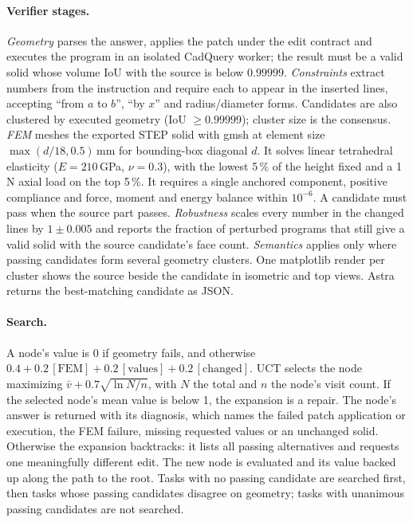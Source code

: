 \paragraph{Verifier stages.}
\emph{Geometry} parses the answer, applies the patch under the edit contract and executes the program in an isolated CadQuery worker; the result must be a valid solid whose volume IoU with the source is below $0.99999$. \emph{Constraints} extract numbers from the instruction and require each to appear in the inserted lines, accepting ``from $a$ to $b$'', ``by $x$'' and radius/diameter forms. Candidates are also clustered by executed geometry (IoU $\geq0.99999$); cluster size is the consensus. \emph{FEM} meshes the exported STEP solid with gmsh at element size $\max(d/18,0.5)$\,mm for bounding-box diagonal $d$. It solves linear tetrahedral elasticity ($E=210$\,GPa, $\nu=0.3$), with the lowest 5\,\% of the height fixed and a 1\,N axial load on the top 5\,\%. It requires a single anchored component, positive compliance and force, moment and energy balance within $10^{-6}$. A candidate must pass when the source part passes. \emph{Robustness} scales every number in the changed lines by $1\pm0.005$ and reports the fraction of perturbed programs that still give a valid solid with the source candidate's face count. \emph{Semantics} applies only where passing candidates form several geometry clusters. One matplotlib render per cluster shows the source beside the candidate in isometric and top views. Astra returns the best-matching candidate as JSON.

\paragraph{Search.}
A node's value is 0 if geometry fails, and otherwise $0.4+0.2\,[\text{FEM}]+0.2\,[\text{values}]+0.2\,[\text{changed}]$. UCT selects the node maximizing $\bar v+0.7\sqrt{\ln N/n}$, with $N$ the total and $n$ the node's visit count. If the selected node's mean value is below 1, the expansion is a repair. The node's answer is returned with its diagnosis, which names the failed patch application or execution, the FEM failure, missing requested values or an unchanged solid. Otherwise the expansion backtracks: it lists all passing alternatives and requests one meaningfully different edit. The new node is evaluated and its value backed up along the path to the root. Tasks with no passing candidate are searched first, then tasks whose passing candidates disagree on geometry; tasks with unanimous passing candidates are not searched.

